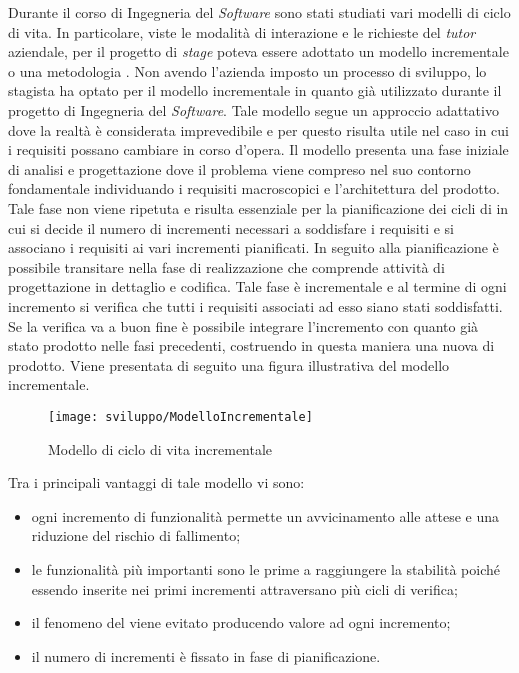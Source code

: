 Durante il corso di Ingegneria del \textit{Software} sono stati studiati vari modelli di ciclo di vita. In particolare, viste le modalità di interazione e le richieste del \textit{tutor} aziendale, per il progetto di \textit{stage} poteva essere adottato un modello incrementale o una metodologia . Non avendo l'azienda imposto un processo di sviluppo, lo stagista ha optato per il modello incrementale in quanto già utilizzato durante il progetto di Ingegneria del \textit{Software}. Tale modello segue un approccio adattativo dove la realtà è considerata imprevedibile e per questo risulta utile nel caso in cui i requisiti possano cambiare in corso d'opera. Il modello presenta una fase iniziale di analisi e progettazione dove il problema viene compreso nel suo contorno fondamentale individuando i requisiti macroscopici e l'architettura del prodotto. Tale fase non viene ripetuta e risulta essenziale per la pianificazione dei cicli di  in cui si decide il numero di incrementi necessari a soddisfare i requisiti e si associano i requisiti ai vari incrementi pianificati. In seguito alla pianificazione è possibile transitare nella fase di realizzazione che comprende attività di progettazione in dettaglio e codifica. Tale fase è incrementale e al termine di ogni incremento si verifica che tutti i requisiti associati ad esso siano stati soddisfatti. Se la verifica va a buon fine è possibile integrare l'incremento con quanto già stato prodotto nelle fasi precedenti, costruendo in questa maniera una nuova  di prodotto. Viene presentata di seguito una figura illustrativa del modello incrementale.

\begin{figure}[!h] 
    \centering 
    \texttt{[image: sviluppo/ModelloIncrementale]} 
    \caption{Modello di ciclo di vita incrementale}
\end{figure}

Tra i principali vantaggi di tale modello vi sono:
\begin{itemize}
	\item ogni incremento di funzionalità permette un avvicinamento alle attese e una riduzione del rischio di fallimento;
	\item le funzionalità più importanti sono le prime a raggiungere la stabilità poiché essendo inserite nei primi incrementi attraversano più cicli di verifica;
	\item il fenomeno del  viene evitato producendo valore ad ogni incremento;
	\item il numero di incrementi è fissato in fase di pianificazione.
\end{itemize}

